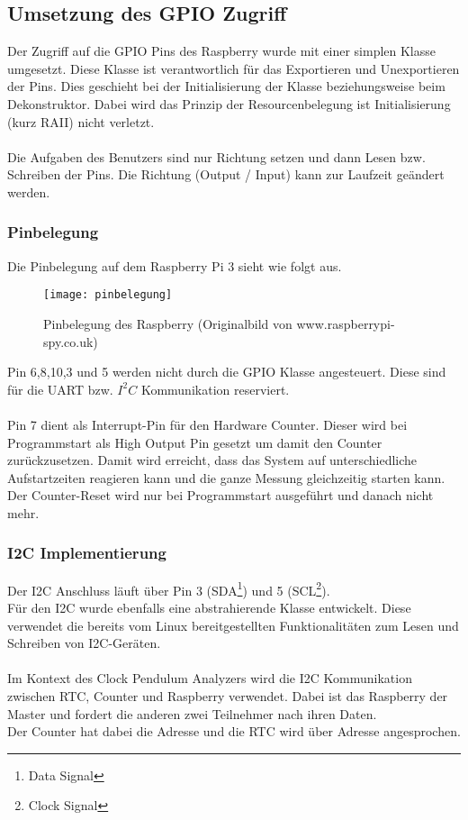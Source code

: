 \subsection{Umsetzung des GPIO Zugriff}
Der Zugriff auf die GPIO Pins des Raspberry wurde mit einer simplen Klasse umgesetzt. Diese Klasse ist verantwortlich für das Exportieren und Unexportieren der Pins. Dies geschieht bei der Initialisierung der Klasse beziehungsweise beim Dekonstruktor. Dabei wird das Prinzip der Resourcenbelegung ist Initialisierung (kurz RAII) nicht verletzt.\\
\\
Die Aufgaben des Benutzers sind nur Richtung setzen und dann Lesen bzw. Schreiben der Pins. Die Richtung (Output / Input) kann zur Laufzeit geändert werden.

\subsubsection{Pinbelegung}
Die Pinbelegung auf dem Raspberry Pi 3 sieht wie folgt aus.
\begin{figure}[H]
    \centering
    \texttt{[image: pinbelegung]}
    \caption{Pinbelegung des Raspberry (Originalbild von www.raspberrypi-spy.co.uk)}
\end{figure}

\noindent Pin 6,8,10,3 und 5 werden nicht durch die GPIO Klasse angesteuert. Diese sind für die UART bzw. $I^2C$ Kommunikation reserviert.\\\\
Pin 7 dient als Interrupt-Pin für den Hardware Counter. Dieser wird bei Programmstart als High Output Pin gesetzt um damit den Counter zurückzusetzen. Damit wird erreicht, dass das System auf unterschiedliche Aufstartzeiten reagieren kann und die ganze Messung gleichzeitig starten kann. Der Counter-Reset wird nur bei Programmstart ausgeführt und danach nicht mehr.

\subsubsection{I2C Implementierung}
Der I2C Anschluss läuft über Pin 3 (SDA\footnote{Data Signal}) und 5 (SCL\footnote{Clock Signal}).\\
Für den I2C wurde ebenfalls eine abstrahierende Klasse entwickelt. Diese verwendet die bereits vom Linux bereitgestellten Funktionalitäten zum Lesen und Schreiben von I2C-Geräten.\\
\\
Im Kontext des Clock Pendulum Analyzers wird die I2C Kommunikation zwischen RTC, Counter und Raspberry verwendet. Dabei ist das Raspberry der Master und fordert die anderen zwei Teilnehmer nach ihren Daten.\\
Der Counter hat dabei die Adresse %
und die RTC wird über Adresse %
angesprochen.

